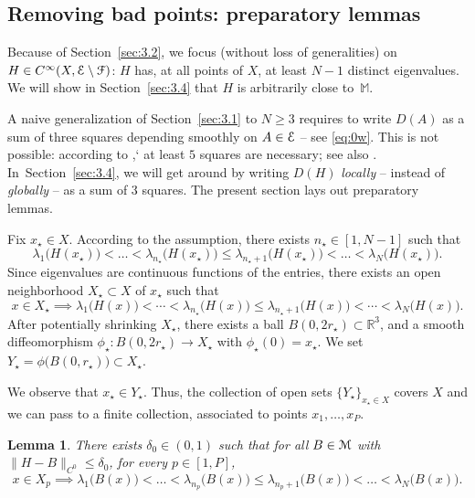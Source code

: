 \documentclass[11pt]{article}
\numberwithin{equation}{section}
\let\pazocal\EuScript
\newtheorem{lem}{Lemma}[section]
\theoremstyle{definition}
\newcommand{\FF}{\pazocal{F}}
\newcommand{\EE}{\pazocal{E}}
\newcommand{\MM}{\pazocal{M}}
\newcommand{\R}{\mathbb{R}}
\newcommand{\Mm}{\mathbb{M}}
\begin{document}
\subsection{Removing bad points: preparatory lemmas}\label{sec:3.3} Because of Section~\ref{sec:3.2}, we focus (without loss of generalities) on $H \in C^\infty(X, \EE\setminus \FF)$: $H$ has, at all points of $X$, at least $N-1$ distinct eigenvalues. We will show in Section~\ref{sec:3.4} that $H$ is arbitrarily close to~$\Mm$.

A naive generalization of Section~\ref{sec:3.1} to $N \geq 3$ requires to write $D(A)$ as a sum of three squares depending smoothly on $A \in \EE$ -- see \eqref{eq:0w}. This is not possible: according to \cite{D11},` at least $5$ squares are necessary; see also \cite{I92,L98,P02,D11}. In~Section~\ref{sec:3.4}, we will get around by writing $D(H)$ \textit{locally} -- instead of \textit{globally} -- as a sum of $3$ squares. The present section lays out preparatory lemmas.

Fix $x_\star \in X$. According to the assumption, there exists $n_\star \in [1,N-1]$ such that
\begin{equation*}
\lambda_1\bigl( H(x_\star) \bigr) < \dots < \lambda_{n_\star}\bigl( H(x_\star) \bigr) \leq \lambda_{n_\star+1}\bigl( H(x_\star) \bigr) < \dots < \lambda_N\bigl( H(x_\star) \bigr).
\end{equation*}
Since eigenvalues are continuous functions of the entries, there exists an open neighborhood $X_\star \subset X$ of $x_\star$ such that
\begin{equation}\label{eq:2c}
x \in X_\star \implies
\lambda_1\bigl( H(x) \bigr) \!<\! \cdots \!<\! \lambda_{n_\star}\bigl( H(x) \bigr) \!\leq\! \lambda_{n_\star+1}\bigl( H(x) \bigr) \!<\! \cdots \!<\! \lambda_N\bigl( H(x) \bigr).
\end{equation}
After potentially shrinking $X_\star$, there exists a ball $B(0,2r_\star) \subset \R^3$, and a smooth diffeomorphism $\phi_\star : B(0,2r_\star) \to X_\star$ with $\phi_\star(0) = x_\star$. We set $Y_\star = \phi\bigl(B(0,r_\star)\bigr) \subset X_\star$.

We observe that $x_\star \in Y_\star$. Thus, the collection of open sets $\{ Y_\star \}_{x_\star \in X}$ covers $X$ and we can pass to a finite collection, associated to points $x_1, \dots, x_P$.

\begin{lem}\label{lem:1b} There exists $\delta_0 \in (0,1)$ such that for all $B \in \MM$ with $\| H-B\|_{C^0} \leq \delta_0$, for every $p \in [1,P]$,
\begin{equation*}
x \in X_p \implies
\lambda_1\bigl( B(x) \bigr) < \dots < \lambda_{n_p}\bigl( B(x) \bigr) \leq \lambda_{n_p+1}\bigl( B(x) \bigr) < \dots < \lambda_N\bigl( B(x) \bigr).
\end{equation*}
\end{lem}
\end{document}

